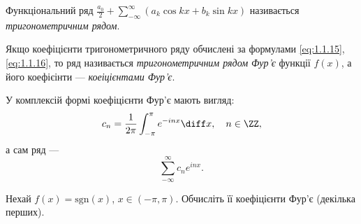 \begin{definition}
    Функціональний ряд $\frac{a_0}{2} + \sum_{-\infty}^\infty (a_k \cos k x + b_k \sin k x)$ називається \textit{тригонометричним рядом}.
\end{definition}

\begin{definition}
    Якщо коефіцієнти тригонометричного ряду обчислені за формулами \eqref{eq:1.1.15}, \eqref{eq:1.1.16}, то ряд називається \textit{тригонометричним рядом Фур'є} функції $f(x)$, а його коефієінти --- \textit{коеіцієнтами Фур'є}.
\end{definition}

\begin{remark}
    У комплексій формі коефіцієнти Фур'є мають вигляд:
    \begin{equation}
        c_n = \frac{1}{2 \pi} \int_{-\pi}^\pi e^{-i n x} \diff x, \quad n \in \ZZ,
    \end{equation}
    а сам ряд ---
    \begin{equation}
        \sum_{-\infty}^\infty c_n e^{i n x}.
    \end{equation}
\end{remark}

\begin{exercise}
    Нехай $f(x) = \text{sgn}(x)$, $x \in (-\pi, \pi)$. Обчисліть її коефіцієнти Фур'є (декілька перших).
\end{exercise}

